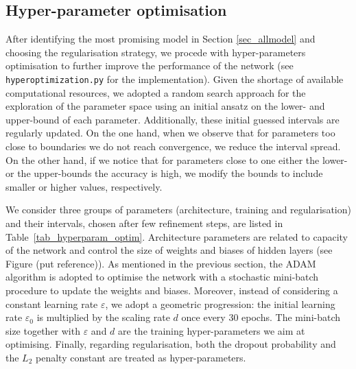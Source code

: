 \documentclass{article}
\begin{document}
\subsection{Hyper-parameter optimisation}
After identifying  the most promising model in Section \ref{sec_allmodel} and choosing the  regularisation strategy, we procede with hyper-parameters optimisation to further improve the performance of the network (see \verb|hyperoptimization.py| for the implementation). 
 Given the shortage of available computational resources, we adopted a random search approach for the exploration of the parameter space using an initial ansatz  on the lower- and upper-bound of each parameter.
 Additionally,  these initial guessed intervals are regularly updated.
 On the one hand, when we observe that for parameters too close to boundaries we do not reach convergence, we reduce the interval spread.
 On the other hand, if we notice that for parameters close to one either the lower- or the upper-bounds the accuracy is high, we modify the bounds to include smaller or higher values, respectively. 

We consider three groups of  parameters (architecture, training and regularisation) and their intervals, chosen after few refinement steps, are listed in Table~\ref{tab_hyperparam_optim}.  
 Architecture parameters are related to capacity of the network and control the size of weights and biases of hidden layers (see Figure (put reference)). 
 As mentioned in the previous section, the ADAM algorithm is adopted to optimise the network with a stochastic mini-batch procedure to update the weights and biases. 
Moreover,  instead of considering a constant learning rate $\varepsilon$, we adopt a geometric progression: the initial learning rate $\varepsilon_0$ is multiplied by the scaling rate $d$ once every 30 epochs. 
The  mini-batch size  together with $\varepsilon$ and $d$ are the training   hyper-parameters we aim at optimising. 
Finally, regarding regularisation, both the dropout probability and the $L_2$ penalty constant are treated as hyper-parameters.
 
\end{document}

